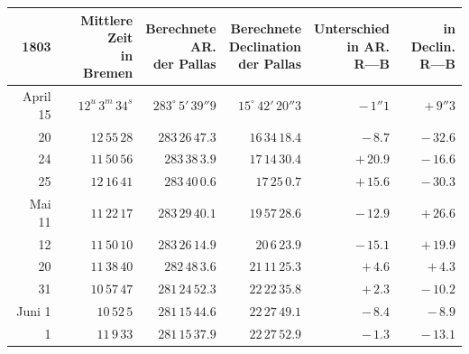 \begin{center}
\begingroup\fontsize{9}{11}\selectfont\setlength{\tabcolsep}{3pt}\renewcommand{\arraystretch}{1.12}
\begin{tabular}{r|r|r|r|r|r}
1803 & \shortstack{Mittlere Zeit\\in\\Bremen} & \shortstack{Berechnete\\AR.\\der Pallas} & \shortstack{Berechnete\\Declination\\der Pallas} & \shortstack{Unterschied\\in AR.\\R—B} & \shortstack{in Declin.\\R—B} \\ \hline
April 15 & $12^u\,3^m\,34^s$ & $283^\circ\,5'\,39''9$ & $15^\circ\,42'\,20''3$ & $-\,1''1$ & $+\,9''3$ \\
20 & $12\,55\,28$ & $283\,26\,47.3$ & $16\,34\,18.4$ & $-\,8.7$ & $-\,32.6$ \\
24 & $11\,50\,56$ & $283\,38\,3.9$ & $17\,14\,30.4$ & $+\,20.9$ & $-\,16.6$ \\
25 & $12\,16\,41$ & $283\,40\,0.6$ & $17\,25\,0.7$ & $+\,15.6$ & $-\,30.3$ \\
Mai 11 & $11\,22\,17$ & $283\,29\,40.1$ & $19\,57\,28.6$ & $-\,12.9$ & $+\,26.6$ \\
12 & $11\,50\,10$ & $283\,26\,14.9$ & $20\,6\,23.9$ & $-\,15.1$ & $+\,19.9$ \\
20 & $11\,38\,40$ & $282\,48\,3.6$ & $21\,11\,25.3$ & $+\,4.6$ & $+\,4.3$ \\
31 & $10\,57\,47$ & $281\,24\,52.3$ & $22\,22\,35.8$ & $+\,2.3$ & $-\,10.2$ \\
Juni 1 & $10\,52\,5$ & $281\,15\,44.6$ & $22\,27\,49.1$ & $-\,8.4$ & $-\,8.9$ \\
1 & $11\,9\,33$ & $281\,15\,37.9$ & $22\,27\,52.9$ & $-\,1.3$ & $-\,13.1$ \\
\end{tabular}\endgroup
\end{center}

\begin{flushright}
\end{flushright}

